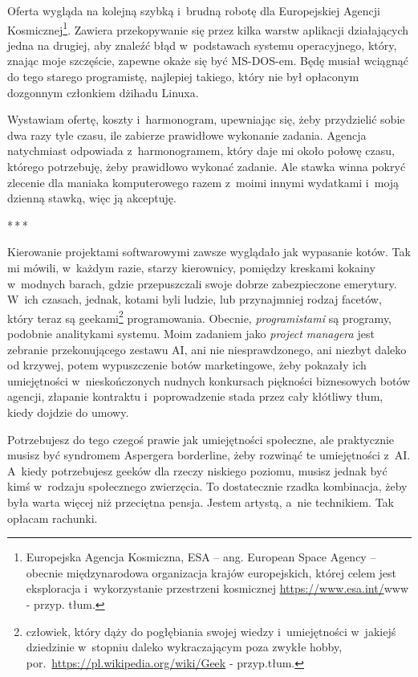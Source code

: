 \documentclass[oneside,polish,12pt,sfheadings]{mwbk}
\newcommand{\threeast}{\bigskip\par\centerline{*\,*\,*}\medskip\par}%
\begin{document}
Oferta wygląda na kolejną szybką i~brudną robotę dla Europejskiej
Agencji Kosmicznej\footnote{Europejska Agencja
Kosmiczna, ESA -- ang. European Space Agency -- obecnie międzynarodowa
organizacja krajów europejskich, której celem jest eksploracja i~wykorzystanie przestrzeni kosmicznej \url{https://www.esa.int/}{www} - przyp.
tłum.}. Zawiera przekopywanie się przez kilka warstw aplikacji
działających jedna na drugiej, aby znaleźć błąd w~podstawach systemu
operacyjnego, który, znając moje szczęście, zapewne okaże się być
MS-DOS-em. Będę musiał wciągnąć do tego starego programistę, najlepiej
takiego, który nie był opłaconym dozgonnym członkiem dżihadu Linuxa.

Wystawiam ofertę, koszty i~harmonogram, upewniając się, żeby przydzielić
sobie dwa razy tyle czasu, ile zabierze prawidłowe wykonanie zadania.
Agencja natychmiast odpowiada z~harmonogramem, który daje mi około
połowę czasu, którego potrzebuję, żeby prawidłowo wykonać zadanie. Ale
stawka winna pokryć zlecenie dla maniaka komputerowego razem z~moimi
innymi wydatkami i~moją dzienną stawką, więc ją akceptuję.

\threeast

Kierowanie projektami softwarowymi zawsze wyglądało jak wypasanie kotów.
Tak mi mówili, w~każdym razie, starzy kierownicy, pomiędzy kreskami
kokainy w~modnych barach, gdzie przepuszczali swoje dobrze zabezpieczone
emerytury. W~ich czasach, jednak, kotami byli ludzie, lub przynajmniej
rodzaj facetów, który teraz są
geekami\footnote{człowiek, który dąży do pogłębiania
swojej wiedzy i~umiejętności w~jakiejś dziedzinie w~stopniu daleko
wykraczającym poza zwykłe hobby, por.~\url{https://pl.wikipedia.org/wiki/Geek} -
przyp.tłum.} programowania. Obecnie, \emph{programistami} są
programy, podobnie analitykami systemu. Moim zadaniem jako \emph{project
managera} jest zebranie przekonującego zestawu AI, ani nie
niesprawdzonego, ani niezbyt daleko od krzywej, potem wypuszczenie botów
marketingowe, żeby pokazały ich umiejętności w~nieskończonych nudnych
konkursach piękności biznesowych botów agencji, złapanie kontraktu i~poprowadzenie stada przez cały kłótliwy tłum, kiedy dojdzie do umowy.

Potrzebujesz do tego czegoś prawie jak umiejętności społeczne, ale
praktycznie musisz być syndromem Aspergera borderline, żeby rozwinąć te
umiejętności z~AI. A~kiedy potrzebujesz geeków dla rzeczy niskiego
poziomu, musisz jednak być kimś w~rodzaju społecznego zwierzęcia. To
dostatecznie rzadka kombinacja, żeby była warta więcej niż przeciętna
pensja. Jestem artystą, a~nie technikiem. Tak opłacam rachunki.
\end{document}
